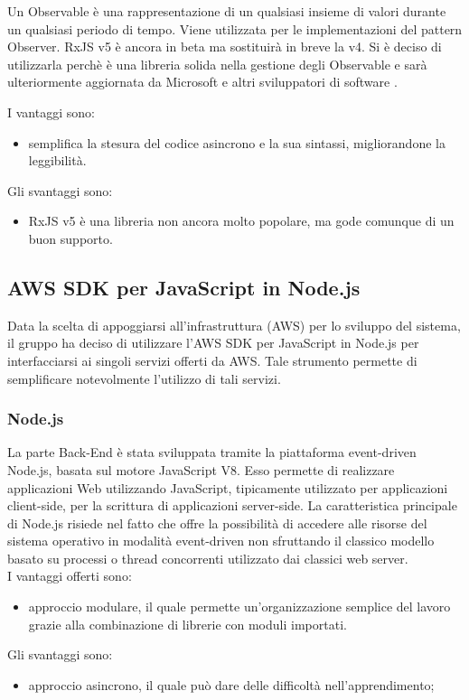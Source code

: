 Un Observable è una rappresentazione di un qualsiasi insieme di valori durante un qualsiasi periodo di tempo. Viene utilizzata per le implementazioni del pattern Observer.
RxJS v5 è ancora in beta ma sostituirà in breve la v4. Si è deciso di utilizzarla perchè è una libreria solida nella gestione degli Observable e sarà ulteriormente aggiornata
da Microsoft e altri sviluppatori di software .

I vantaggi sono:
\begin{itemize}
	\item semplifica la stesura del codice asincrono e la sua sintassi, migliorandone la leggibilità.
\end{itemize}
Gli svantaggi sono:
\begin{itemize}
	\item RxJS v5 è una libreria non ancora molto popolare, ma gode comunque di un buon supporto.
\end{itemize}

\subsection{AWS SDK per JavaScript in Node.js}

Data la scelta di appoggiarsi all'infrastruttura  (AWS) per lo sviluppo del sistema, il gruppo ha deciso di utilizzare l'AWS SDK per JavaScript in Node.js per
interfacciarsi ai singoli servizi offerti da AWS. Tale strumento permette di semplificare notevolmente l'utilizzo di tali servizi.

\subsubsection{Node.js}
La parte Back-End è stata sviluppata tramite la piattaforma event-driven Node.js, basata sul motore JavaScript V8. Esso permette di realizzare applicazioni Web utilizzando JavaScript, tipicamente utilizzato per applicazioni client-side, per la scrittura di applicazioni server-side. La caratteristica principale di Node.js risiede nel fatto che offre la possibilità di accedere alle risorse del sistema operativo in modalità event-driven non sfruttando il classico modello basato su processi o thread concorrenti utilizzato dai classici web server.\\
I vantaggi offerti sono:
\begin{itemize}
	\item approccio modulare, il quale permette un’organizzazione semplice del lavoro grazie alla combinazione di librerie con moduli importati.
\end{itemize}
Gli svantaggi sono:
\begin{itemize}
	\item approccio asincrono, il quale può dare delle difficoltà nell'apprendimento;
\end{itemize}

